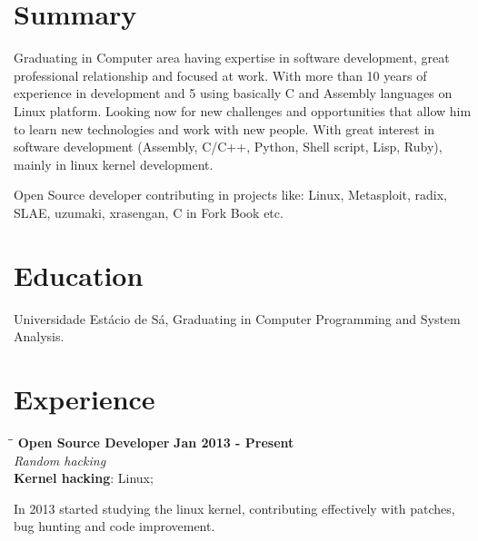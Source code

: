 \documentclass[margin]{res}
\begin{document}

\address{Juazeiro do Norte, CE, Brazil \\
  \href{mailto:geyslan@gmail.com}{geyslan@gmail.com} \\ Phone: 55 88 99617 0441
  \\ Postal Code: 63034-100 }


\begin{resume}

  \section{Summary} Graduating in Computer area having expertise in software
  development, great professional relationship and focused at work. With more
  than 10 years of experience in development and 5 using basically C and
  Assembly languages on Linux platform. Looking now for new challenges and
  opportunities that allow him to learn new technologies and work with new
  people. With great interest in software development (Assembly, C/C++, Python,
  Shell script, Lisp, Ruby), mainly in linux kernel development.

  Open Source developer contributing in projects like: Linux, Metasploit,
  radix, SLAE, uzumaki, xrasengan, C in Fork Book etc.

  \section{Education} Universidade Estácio de Sá, Graduating in Computer
  Programming and System Analysis.

\section{Experience}

\vspace{-0.1in}
\begin{tabbing}
  \hspace{2.3in}\= \hspace{1.7in}\= \kill %
  \textbf{Open Source Developer}    \>\>\textbf{Jan 2013 - Present}\\
  \textit{Random hacking}\\
  \textbf{Kernel hacking}: Linux;
\end{tabbing}\vspace{-20pt}      %
\vspace{2mm} In 2013 started studying the linux kernel, contributing
effectively with patches, bug hunting and code improvement.


\end{resume}
\end{document}
